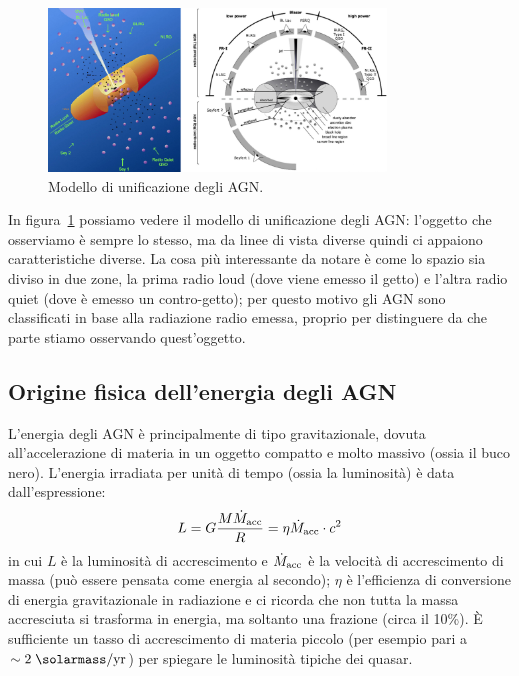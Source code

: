\begin{figure}
    \centering
    \includegraphics[width = 0.8\textwidth]{immagini/modello-unificazione-agn.png}
    \caption{Modello di unificazione degli AGN.}
    \label{fig:modello-unificazione-agn}
\end{figure}

In figura~\ref{fig:modello-unificazione-agn} possiamo vedere il modello di unificazione degli AGN: l'oggetto che osserviamo è sempre lo stesso, ma da linee di vista diverse quindi ci appaiono caratteristiche diverse. La cosa più interessante da notare è come lo spazio sia diviso in due zone, la prima radio loud (dove viene emesso il getto) e l'altra radio quiet (dove è emesso un contro-getto); per questo motivo gli AGN sono classificati in base alla radiazione radio emessa, proprio per distinguere da che parte stiamo osservando quest'oggetto. 

\subsection{Origine fisica dell'energia degli AGN}
L'energia degli AGN è principalmente di tipo gravitazionale, dovuta all'accelerazione di materia in un oggetto compatto e molto massivo (ossia il buco nero). L'energia irradiata per unità di tempo (ossia la luminosità) è data dall'espressione:
\begin{equation}
    \label{eq:luminosità-agn}
    L = G \frac{M\dot{M}_\textup{acc}}{R}=\eta \dot{M}_\textup{acc} \cdot c^2
\end{equation}
in cui $L$ è la luminosità di accrescimento e $\dot{M}_\textup{acc}$ è la velocità di accrescimento di massa (può essere pensata come energia al secondo); $\eta$ è l'efficienza di conversione di energia gravitazionale in radiazione e ci ricorda che non tutta la massa accresciuta si trasforma in energia, ma soltanto una frazione (circa il 10\%). È sufficiente un tasso di accrescimento di materia piccolo (per esempio pari a $\sim 2 \;\si{\solarmass}/\si{yr}$) per spiegare le luminosità tipiche dei quasar. 

